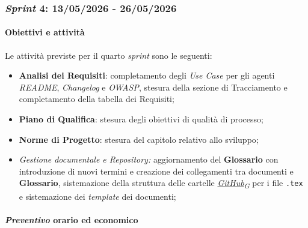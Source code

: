 \documentclass[12pt, a4paper]{article}
\newcommand{\urlglossario}{https://skynetunigroup.github.io/Code_Guardian/Documentazione/RTB/glossario_v1.0.0.pdf} %
\newcommand{\glo}[2]{\href{\urlglossario\#nameddest=#2}{#1\textsubscript{G}}}
\begin{document}
{\subsubsection{\textit{Sprint} 4: 13/05/2026 - 26/05/2026}

\paragraph{Obiettivi e attività}

Le attività previste per il quarto \textit{sprint} sono le seguenti:

\begin{itemize}
    \item \textbf{Analisi dei Requisiti}: completamento degli \textit{Use Case} per gli agenti \textit{README}, \textit{Changelog} e \textit{OWASP}, stesura della sezione di Tracciamento e completamento della tabella dei Requisiti;
\item \textbf{Piano di Qualifica}: stesura degli obiettivi di qualità di processo;
\item \textbf{Norme di Progetto}: stesura del capitolo relativo allo sviluppo;
\item \emph{Gestione documentale e \textit{Repository}:} aggiornamento del \textbf{Glossario} con introduzione di nuovi termini e creazione dei collegamenti tra documenti e \textbf{Glossario}, sistemazione della struttura delle cartelle \textit{\glo{GitHub}{github}} per i file \texttt{.tex} e sistemazione dei \textit{template} dei documenti;
\end{itemize}

\paragraph{\textit{Preventivo} orario ed economico}

}
\end{document}
